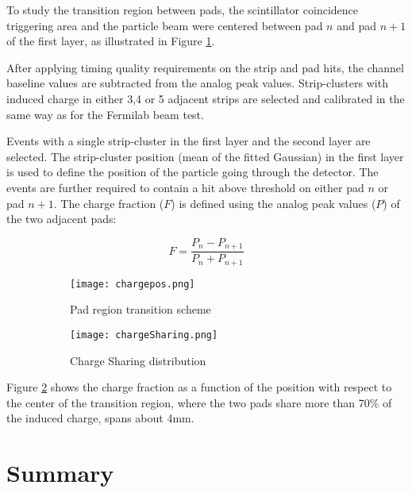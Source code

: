 To study the transition region between pads, the scintillator coincidence triggering area and the particle beam were
centered between pad $n$ and pad $n+1$ of the first layer, as illustrated in Figure \ref{chargepos}.\par

After applying timing quality requirements on the strip and pad hits, the channel baseline values are subtracted from
the analog peak values. Strip-clusters with induced charge in either 3,4 or 5 adjacent strips are selected and
calibrated in the same way as for the Fermilab beam test.\par

Events with a single strip-cluster in the first layer and the second layer are selected. The strip-cluster position
(mean of the fitted Gaussian) in the first layer is used to define the position of the particle going through the
detector. The events are further required to contain a hit above threshold on either pad $n$ or pad $n+1$. The charge
fraction ($F$) is defined using the analog peak values ($P$) of the two adjacent pads:

\begin{equation}
F = \frac{P_n - P_{n+1}}{P_n + P_{n+1}}
\end{equation}

\begin{figure}[H]
\centering
\hspace*{\fill}
\begin{subfigure}[b]{0.45\textwidth}
\texttt{[image: chargepos.png]}
\caption{Pad region transition scheme}\label{chargepos}
\end{subfigure}
\hfill
\begin{subfigure}[b]{0.45\textwidth}
\texttt{[image: chargeSharing.png]}
\caption{Charge Sharing distribution}\label{chargeSharing}
\hspace*{\fill}
\end{subfigure}
\caption{}\label{}
\end{figure}


Figure \ref{chargeSharing} shows the charge fraction as a function of the position with respect to the center of the
transition region, where the two pads share more than 70\% of the induced charge, spans about \unit{4}{mm}.\par

\section{Summary}

